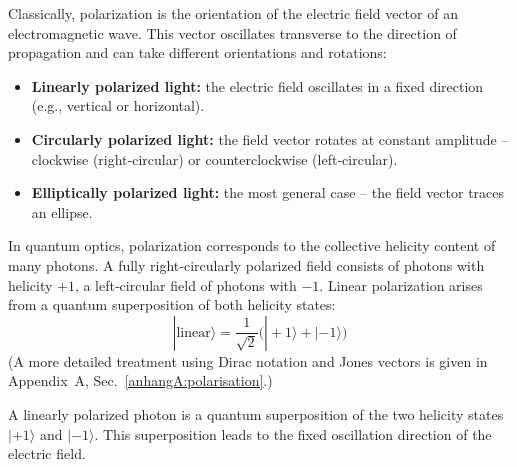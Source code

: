 \vspace{0.5em}
Classically, polarization is the orientation of the electric field vector of an electromagnetic wave. This vector oscillates transverse to the direction of propagation and can take different orientations and rotations:
\begin{itemize}
	\item \textbf{Linearly polarized light:} the electric field oscillates in a fixed direction (e.g., vertical or horizontal).
	\item \textbf{Circularly polarized light:} the field vector rotates at constant amplitude – clockwise (right‑circular) or counterclockwise (left‑circular).
	\item \textbf{Elliptically polarized light:} the most general case – the field vector traces an ellipse.
\end{itemize}

\vspace{0.5em}
In quantum optics, polarization corresponds to the collective helicity content of many photons. A fully right‑circularly polarized field consists of photons with helicity $+1$, a left‑circular field of photons with $-1$. Linear polarization arises from a quantum superposition of both helicity states:
$$
|\text{linear}\rangle = \frac{1}{\sqrt{2}} \bigl( |+1\rangle + |-1\rangle \bigr)
$$
(A more detailed treatment using Dirac notation and Jones vectors is given in Appendix~A, Sec.~\ref{anhangA:polarisation}.)
\vspace{1em}
\begin{tcolorbox}[physikbox, title=Superposition and Polarization]
	\label{box:Superposition}
	A linearly polarized photon is a quantum superposition of the two helicity states $|+1\rangle$ and $|-1\rangle$. This superposition leads to the fixed oscillation direction of the electric field.
\end{tcolorbox}

